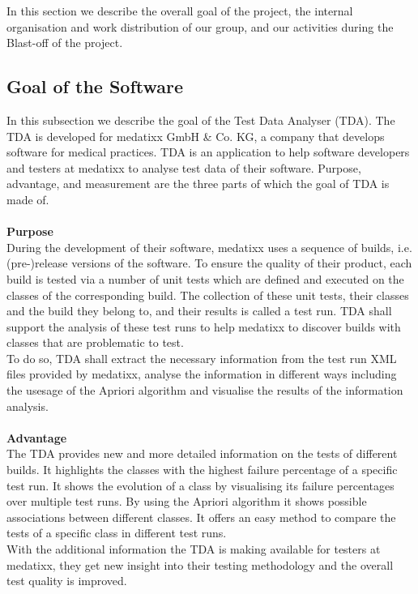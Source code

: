 In this section we describe the overall goal of the project, the internal organisation and work distribution of our group, and our activities during the Blast-off of the project.  \\

\subsection{Goal of the Software}

In this subsection we describe the goal of the Test Data Analyser (TDA). The TDA is developed for medatixx GmbH \& Co. KG, a company that develops software for medical practices. TDA is an application to help software developers and testers at medatixx to analyse test data of their software. Purpose, advantage, and measurement are the three parts of which the goal of TDA is made of. \\
\ \\
{\large\textbf{Purpose}}\\ 

During the development of their software, medatixx uses a sequence of builds, i.e. (pre-)release versions of the software. To ensure the quality of their product, each build is tested via a number of unit tests which are defined and executed on the classes of the corresponding build. The collection of these unit tests, their classes and the build they belong to, and their results is called a test run. TDA shall support the analysis of these test runs to help medatixx to discover builds with classes that are problematic to test. \\ 
To do so, TDA shall extract the necessary information from the test run XML files provided by medatixx, analyse the information in different ways including the usesage of the Apriori algorithm and visualise the results of the information analysis. \\ 
\ \\

{\large\textbf{Advantage}}\\ 
The TDA provides new and more detailed information on the tests of different builds. It highlights the classes with the highest failure percentage of a specific test run. It shows the evolution of a class by visualising its failure percentages over multiple test runs. By using the Apriori algorithm it shows possible associations between different classes. It offers an easy method to compare the tests of a specific class in different test runs. \\ 
With the additional information the TDA is making available for testers at medatixx, they get new insight into their testing methodology and the overall test quality is improved. \\
\ \\

